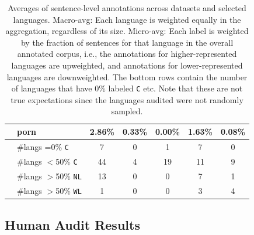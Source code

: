 \begin{table}[th]
{\begin{tabular}{llccccc}
                                                                      & porn                        & 2.86\%                                & 0.33\%                                   & 0.00\%              & 1.63\%         & 0.08\%       \\
            \midrule
                                                                      & \#langs =0\% \texttt{C}     & 7                                     & 0                                        & 1                   & 7              & 0            \\
                                                                      & \#langs $<$50\% \texttt{C}  & 44                                    & 4                                        & 19                  & 11             & 9            \\
                                                                      & \#langs $>$50\% \texttt{NL} & 13                                    & 0                                        & 0                   & 7              & 1            \\
                                                                      & \#langs $>$50\% \texttt{WL} & 1                                     & 0                                        & 0                   & 3              & 4            \\
            \bottomrule
        \end{tabular}%
    }
    \caption{Averages of sentence-level annotations across datasets and selected languages. Macro-avg: Each language is weighted equally in the aggregation, regardless of its size. Micro-avg: Each label is weighted by the fraction of sentences for that language in the overall annotated corpus, i.e., the annotations for higher-represented languages are upweighted, and annotations for lower-represented languages are downweighted. The bottom rows contain the number of languages that have 0\% labeled \texttt{C} etc. Note that these are not true expectations since the languages audited were not randomly sampled. }
    \label{tab:results}
\end{table}


\subsection{Human Audit Results}\label{sec:audit-res}


